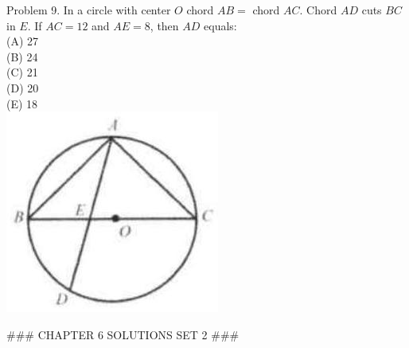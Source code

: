 \documentclass[10pt]{article}
\begin{document}
Problem 9. In a circle with center \(O\) chord \(A B=\) chord \(A C\). Chord \(A D\) cuts \(B C\) in \(E\). If \(A C=12\) and \(A E=8\), then \(A D\) equals:\\
(A) 27\\
(B) 24\\
(C) 21\\
(D) 20\\
(E) 18\\
\includegraphics[max width=\textwidth, center]{2025_04_17_97bc1f7e44d93c271a88g-170}


### CHAPTER 6 SOLUTIONS SET 2 ###
\end{document}
